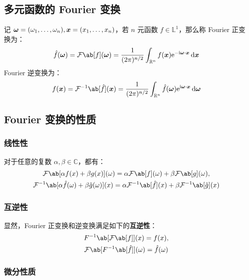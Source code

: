 \subsection{多元函数的 Fourier 变换}

\begin{definition}[多元 Fourier 变换]
    记 $\boldsymbol{\omega} = (\omega_1, \dots, \omega_n), \boldsymbol{x} = (x_1, \dots, x_n)$，若 $n$ 元函数 $f \in \mathbb{L}^{1}$，那么称 Fourier 正变换为：
    $$
    \hat{f}(\vect{\omega}) = \mathcal{F}\ab[f](\vect{\omega}) = \frac{1}{(2\pi)^{n/2}} \int_{\mathbb{R}^n} f(\vect{x}) \E^{-\I \vect{\omega} \cdot \vect{x}} \dd{\vect{x}}
    $$
    Fourier 逆变换为：
    $$
    f(\vect{x}) = \mathcal{F}^{-1}\ab[\hat{f}](\vect{x}) = \frac{1}{(2\pi)^{n/2}} \int_{\mathbb{R}^n} \hat{f}(\vect{\omega}) \E^{\I \vect{\omega} \cdot \vect{x}} \dd{\vect{\omega}}
    $$
\end{definition}

\subsection{Fourier 变换的性质}

\subsubsection{线性性}

对于任意的复数 $\alpha, \beta \in \mathbb{C}$，都有：
$$
\begin{gathered}
    \mathcal{F}\ab[\alpha f(x) + \beta g(x)](\omega) = \alpha \mathcal{F}\ab[f](\omega) + \beta \mathcal{F}\ab[g](\omega), \\
    \mathcal{F}^{-1}\ab[\alpha \hat{f}(\omega) + \beta \hat{g}(\omega)](x) = \alpha \mathcal{F}^{-1}\ab[\hat{f}](x) + \beta \mathcal{F}^{-1}\ab[\hat{g}](x)
\end{gathered}
$$

\subsubsection{互逆性}

显然，Fourier 正变换和逆变换满足如下的\textbf{互逆性}：
$$
\begin{gathered}
    F^{-1}\ab[\mathcal{F}\ab[f]](x) = f(x), \\
    \mathcal{F}\ab[F^{-1}\ab[\hat{f}]](\omega) = \hat{f}(\omega)
\end{gathered}
$$

\subsubsection{微分性质}

